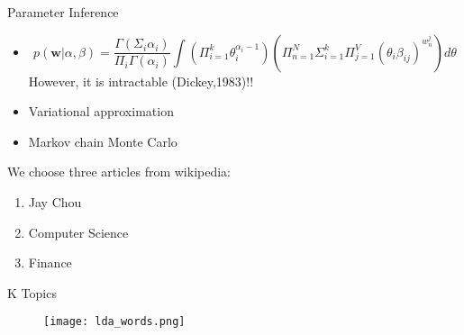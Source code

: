 \documentclass{beamer}
\begin{document}
\begin{frame}{Parameter Inference}
\begin{itemize}

\item {
\begin{equation}
p(\textbf{w}| \alpha , \beta )= \frac{ \Gamma(\Sigma _i \alpha _i)}{ \Pi _i \Gamma ( \alpha _i)} \int 
( \Pi _{i=1}^k \theta_i^{\alpha_i-1} )( \Pi_{n=1}^N  \Sigma_{i=1}^k  \Pi_{j=1}^V( \theta _i \beta _{ij})^{w_n^j} ) d\theta
\end{equation} 
However, it is intractable (Dickey,1983)!!
}
\pause

	\item Variational approximation
	\item Markov chain Monte Carlo
\end{itemize}
\end{frame}

\begin{frame}
	\begin{example}
	We choose three articles from wikipedia:
	\begin{enumerate}
		\item Jay Chou
		\item Computer Science
		\item Finance
\end{enumerate}	 
	\end{example}
\end{frame}

\begin{frame}{K Topics}
\begin{figure}[htbp]
	\centerline{\texttt{[image: lda\_words.png]}}
\end{figure}
\end{frame}
\end{document}
